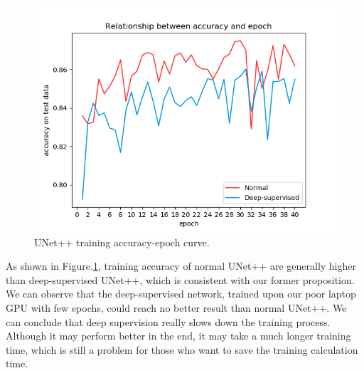 \begin{figure}[!htpb]
\centering
\includegraphics[scale=0.6]{figuras/unetppTraining.png}
\caption{UNet++ training accuracy-epoch curve.}
\label{fig:unetppTrain}
\end{figure}

As shown in Figure.\ref{fig:unetppTrain}, training accuracy of normal UNet++ are generally higher than deep-supervised UNet++, which is consistent with our former proposition. We can observe that the deep-supervised network, trained upon our poor laptop GPU with few epochs, could reach no better result than normal UNet++. We can conclude that deep supervision really slows down the training process. Although it may perform better in the end, it may take a much longer training time, which is still a problem for those who want to save the training calculation time.
